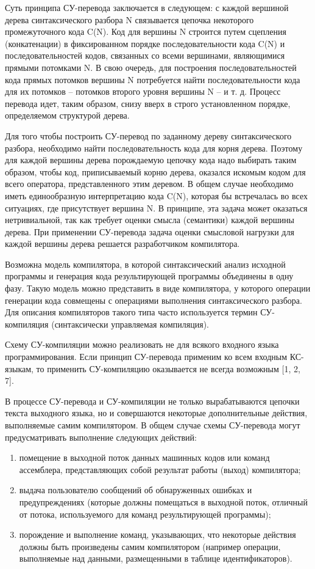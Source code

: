 Суть принципа СУ-перевода заключается в следующем: с каждой вершиной дерева синтаксического разбора N связывается цепочка некоторого промежуточного кода C(N). Код для вершины N строится путем сцепления (конкатенации) в фиксированном порядке последовательности кода C(N) и последовательностей кодов, связанных со всеми вершинами, являющимися прямыми потомками N. В свою очередь, для построения последовательностей кода прямых потомков вершины N потребуется найти последовательности кода для их потомков – потомков второго уровня вершины N – и т. д. Процесс перевода идет, таким образом, снизу вверх в строго установленном порядке, определяемом структурой дерева.

Для того чтобы построить СУ-перевод по заданному дереву синтаксического разбора, необходимо найти последовательность кода для корня дерева. Поэтому для каждой вершины дерева порождаемую цепочку кода надо выбирать таким образом, чтобы код, приписываемый корню дерева, оказался искомым кодом для всего оператора, представленного этим деревом. В общем случае необходимо иметь единообразную интерпретацию кода C(N), которая бы встречалась во всех ситуациях, где присутствует вершина N. В принципе, эта задача может оказаться нетривиальной, так как требует оценки смысла (семантики) каждой вершины дерева. При применении СУ-перевода задача оценки смысловой нагрузки для каждой вершины дерева решается разработчиком компилятора.

Возможна модель компилятора, в которой синтаксический анализ исходной программы и генерация кода результирующей программы объединены в одну фазу. Такую модель можно представить в виде компилятора, у которого операции генерации кода совмещены с операциями выполнения синтаксического разбора. Для описания компиляторов такого типа часто используется термин СУ-компиляция (синтаксически управляемая компиляция).

Схему СУ-компиляции можно реализовать не для всякого входного языка программирования. Если принцип СУ-перевода применим ко всем входным КС-языкам, то применить СУ-компиляцию оказывается не всегда возможным [1, 2, 7].

В процессе СУ-перевода и СУ-компиляции не только вырабатываются цепочки текста выходного языка, но и совершаются некоторые дополнительные действия, выполняемые самим компилятором. В общем случае схемы СУ-перевода могут предусматривать выполнение следующих действий:

\begin{enumerate}
  \item помещение в выходной поток данных машинных кодов или команд ассемблера, представляющих собой результат работы (выход) компилятора;
  \item выдача пользователю сообщений об обнаруженных ошибках и предупреждениях (которые должны помещаться в выходной поток, отличный от потока, используемого для команд результирующей программы);
  \item порождение и выполнение команд, указывающих, что некоторые действия должны быть произведены самим компилятором (например операции, выполняемые над данными, размещенными в таблице идентификаторов).
\end{enumerate}

